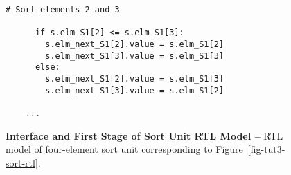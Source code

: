 \begin{figure}
\begin{lstlisting}[xleftmargin={0.9in}]
      # Sort elements 2 and 3

      if s.elm_S1[2] <= s.elm_S1[3]:
        s.elm_next_S1[2].value = s.elm_S1[2]
        s.elm_next_S1[3].value = s.elm_S1[3]
      else:
        s.elm_next_S1[2].value = s.elm_S1[3]
        s.elm_next_S1[3].value = s.elm_S1[2]

    ...
\end{lstlisting}

  \caption{\textbf{Interface and First Stage of Sort Unit RTL Model --}
    RTL model of four-element sort unit corresponding to
    Figure~\ref{fig-tut3-sort-rtl}.}
  \label{code-tut3-sort-rtl}

\end{figure}


